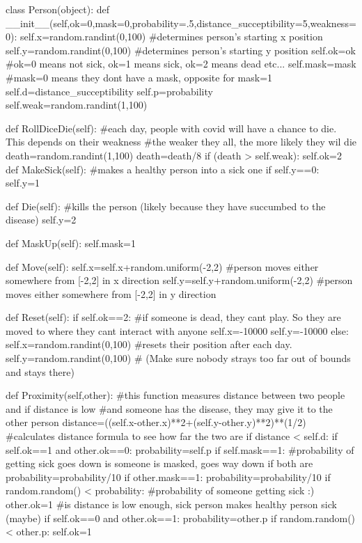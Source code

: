 
class Person(object):
    def __init__(self,ok=0,mask=0,probability=.5,distance_succeptibility=5,weakness=0):
        self.x=random.randint(0,100) #determines person's starting x position
        self.y=random.randint(0,100) #determines person's starting y position
        self.ok=ok #ok=0 means not sick, ok=1 means sick, ok=2 means dead etc...
        self.mask=mask #mask=0 means they dont have a mask, opposite for mask=1
        self.d=distance_succeptibility
        self.p=probability
        self.weak=random.randint(1,100)
    
    def RollDiceDie(self): #each day, people with covid will have a chance to die. This depends on their weakness
        #the weaker they all, the more likely they wil die
        death=random.randint(1,100)
        death=death/8
        if (death > self.weak):
            self.ok=2
    def MakeSick(self): #makes a healthy person into a sick one
        if self.y==0:
            self.y=1
            
    def Die(self): #kills the person (likely because they have succumbed to the disease)
        self.y=2
        
    def MaskUp(self):
        self.mask=1
        
    def Move(self):
        self.x=self.x+random.uniform(-2,2) #person moves either somewhere from [-2,2] in x direction
        self.y=self.y+random.uniform(-2,2) #person moves either somewhere from [-2,2] in y direction
        
    def Reset(self):
        if self.ok==2: #if someone is dead, they cant play. So they are moved to where they cant interact with anyone
            self.x=-10000
            self.y=-10000
        else:
            self.x=random.randint(0,100) #resets their position after each day. 
            self.y=random.randint(0,100) # (Make sure nobody strays too far out of bounds and stays there)
        
        
    def Proximity(self,other): #this function measures distance between two people and if distance is low
        #and someone has the disease, they may give it to the other person
        distance=((self.x-other.x)**2+(self.y-other.y)**2)**(1/2) #calculates distance formula to see how far the two are
        if distance < self.d: 
            if self.ok==1 and other.ok==0:
                probability=self.p
                if self.mask==1: #probability of getting sick goes down is someone is masked, goes way down if both are
                    probability=probability/10
                if other.mask==1:
                    probability=probability/10
                if random.random() < probability: #probability of someone getting sick :)
                    other.ok=1 #is distance is low enough, sick person makes healthy person sick (maybe)
            if self.ok==0 and other.ok==1:
                probability=other.p
                if random.random() < other.p:
                    self.ok=1


